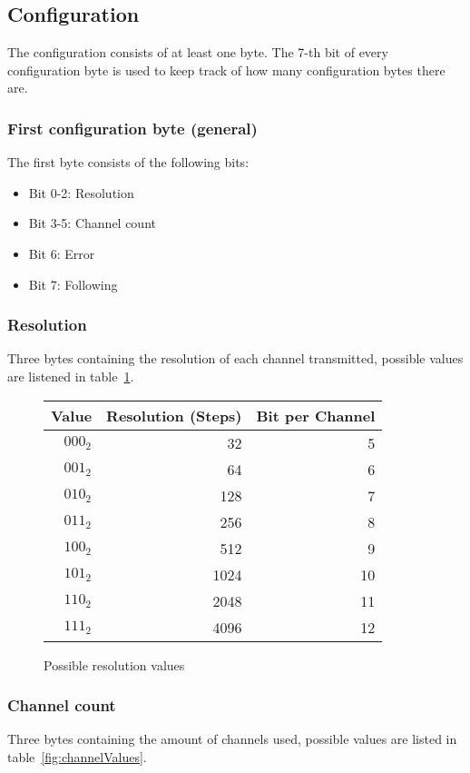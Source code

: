 \documentclass{scrreprt}
\begin{document}
\subsection{Configuration}
The configuration consists of at least one byte. The 7-th bit  of every configuration byte is used to keep track of how many configuration bytes there are.

\subsubsection{First configuration byte (general)}
The first byte consists of the following bits:
\begin{itemize}
 \item Bit 0-2: Resolution
 \item Bit 3-5: Channel count
 \item Bit 6: Error
 \item Bit 7: Following
\end{itemize}

\subsubsection{Resolution}
Three bytes containing the resolution of each channel transmitted, possible
values are listened in table~\ref{fig:resValues}.
\begin{figure}
   \centering
   \begin{tabular}{rrr}
     \toprule
     Value & Resolution (Steps) &	Bit per Channel \\
     \midrule
     $000_2$ & 32 & 5 \\
     $001_2$ & 64 & 6 \\
     $010_2$ & 128 & 7 \\
     $011_2$ & 256 & 8 \\
     $100_2$ & 512 & 9 \\
     $101_2$ & 1024 & 10 \\
     $110_2$ & 2048 & 11\\
     $111_2$ & 4096 & 12 \\
     \bottomrule
   \end{tabular}
   \caption{Possible resolution values}
   \label{fig:resValues}
\end{figure}


\subsubsection{Channel count}
Three bytes containing the amount of channels used, possible values are
listed in table~\ref{fig:channelValues}.
\end{document}
